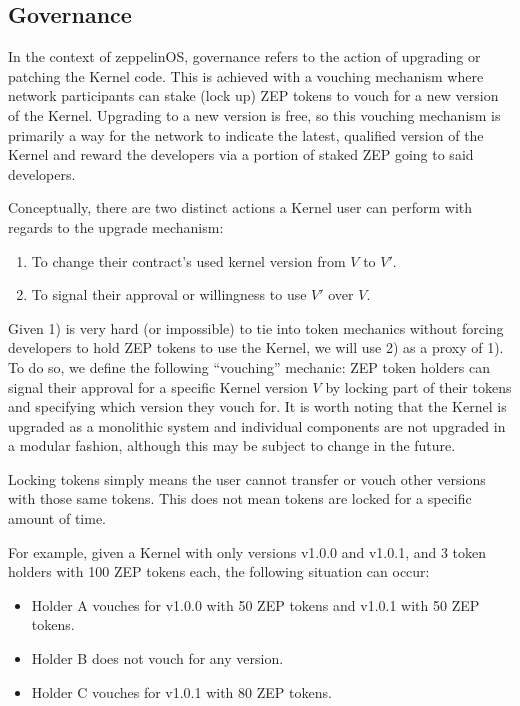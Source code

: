 \documentclass[]{article}
\makeatletter
\DeclareRobustCommand{\_}{%
  \leavevmode\vbox{%
    \hrule\@width.5em
          \@height-.26ex
          \@depth\dimexpr.26ex+.28pt\relax}}
\makeatother
\begin{document}
\subsection{Governance}

In the context of zeppelinOS, governance refers to the action of
upgrading or patching the Kernel code. This is achieved with a vouching
mechanism where network participants can stake (lock up) ZEP tokens to
vouch for a new version of the Kernel. Upgrading to a new version is
free, so this vouching mechanism is primarily a way for the network to
indicate the latest, qualified version of the Kernel and reward the
developers via a portion of staked ZEP going to said developers.

Conceptually, there are two distinct actions a Kernel user can
perform with regards to the upgrade mechanism:

\begin{enumerate}[label=\arabic*)]
  \item
    To change their contract's used kernel version from $V$ to $V'$. 
  \item
    To signal their approval or willingness to use $V'$ over $V$.
\end{enumerate}

Given 1) is very hard (or impossible) to tie into token mechanics
without forcing developers to hold ZEP tokens to use the Kernel,
we will use 2) as a proxy of 1). To do so, we define the following
``vouching'' mechanic: ZEP token holders can signal their approval for a
specific Kernel version $V$ by locking part of their tokens and
specifying which version they vouch for. It is worth noting that the
Kernel is upgraded as a monolithic system and individual components
are not upgraded in a modular fashion, although this may be subject
to change in the future.

Locking tokens simply means the user cannot transfer or vouch other
versions with those same tokens. This does not mean tokens are locked for
a specific amount of time.

For example, given a Kernel with only versions v1.0.0 and v1.0.1, and 3
token holders with 100 ZEP tokens each, the following situation can
occur:

\begin{itemize}
  \item
    Holder A vouches for v1.0.0 with 50 ZEP tokens and v1.0.1 with 50 ZEP
    tokens.
  \item
    Holder B does not vouch for any version.
  \item
    Holder C vouches for v1.0.1 with 80 ZEP tokens.
\end{itemize}
\end{document}
